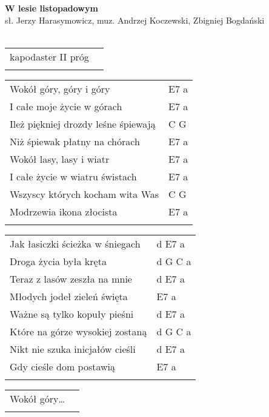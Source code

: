 \documentclass[a5paper]{article}
\begin{document}


\noindent
\fontsize{12pt}{15pt}\selectfont
\textbf{W lesie listopadowym} \\
\fontsize{8pt}{10pt}\selectfont
sł. Jerzy Harasymowicz, muz. Andrzej Koczewski, Zbigniej Bogdański \\ \\
\fontsize{10pt}{12pt}\selectfont
{}
\begin{tabular}{@{}p{8.00cm}p{3cm}@{}}
\noindent
kapodaster II próg & \\ \\
\end{tabular}

\noindent
\begin{tabular}{@{}p{7.00cm}p{3cm}@{}}
Wokół góry, góry i góry	& E7 a \\
I całe moje życie w górach & E7 a \\
Ileż piękniej drozdy leśne śpiewają & C G \\
Niż śpiewak płatny na chórach & E7 a \\
Wokół lasy, lasy i wiatr & E7 a \\
I całe życie w wiatru świstach & E7 a \\
Wszyscy których kocham wita Was	& C G \\
Modrzewia ikona złocista & E7 a \\ \\
\end{tabular}

\noindent
\begin{tabular}{@{}p{8.00cm}p{3cm}@{}}
Jak łasiczki ścieżka w śniegach & d E7 a \\
Droga życia była kręta & d G C a \\
Teraz z lasów zeszła na mnie & d E7 a \\
Młodych jodeł zieleń święta & E7 a \\
Ważne są tylko kopuły pieśni & d E7 a \\
Które na górze wysokiej zostaną & d G C a \\
Nikt nie szuka inicjałów cieśli & d E7 a \\
Gdy cieśle dom postawią & E7 a \\ \\
\end{tabular}

\noindent
\begin{tabular}{@{}p{7.00cm}p{3cm}@{}}
Wokół góry… \\ \\
\end{tabular}
\end{document}
